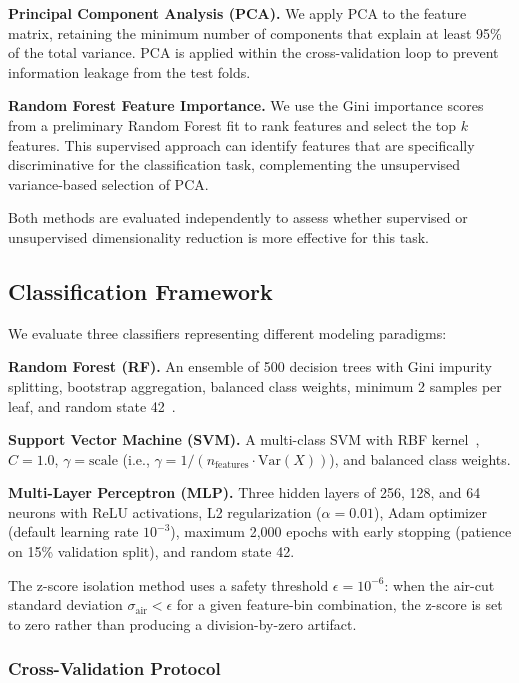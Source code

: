 \textbf{Principal Component Analysis (PCA).} We apply PCA to the feature matrix, retaining the minimum number of components that explain at least 95\% of the total variance. PCA is applied within the cross-validation loop to prevent information leakage from the test folds.

\textbf{Random Forest Feature Importance.} We use the Gini importance scores from a preliminary Random Forest fit to rank features and select the top $k$ features. This supervised approach can identify features that are specifically discriminative for the classification task, complementing the unsupervised variance-based selection of PCA.

Both methods are evaluated independently to assess whether supervised or unsupervised dimensionality reduction is more effective for this task.

\subsection{Classification Framework}\label{sec:classification}

We evaluate three classifiers representing different modeling paradigms:

\textbf{Random Forest (RF).} An ensemble of 500 decision trees with Gini impurity splitting, bootstrap aggregation, balanced class weights, minimum 2 samples per leaf, and random state 42~\cite{breiman2001randomforests}.

\textbf{Support Vector Machine (SVM).} A multi-class SVM with RBF kernel~\cite{widodo2007svm}, $C = 1.0$, $\gamma = \text{scale}$ (i.e., $\gamma = 1 / (n_\text{features} \cdot \mathrm{Var}(X))$), and balanced class weights.

\textbf{Multi-Layer Perceptron (MLP).} Three hidden layers of 256, 128, and 64 neurons with ReLU activations, L2 regularization ($\alpha = 0.01$), Adam optimizer (default learning rate $10^{-3}$), maximum 2{,}000 epochs with early stopping (patience on 15\% validation split), and random state 42.

The z-score isolation method uses a safety threshold $\epsilon = 10^{-6}$: when the air-cut standard deviation $\sigma_\text{air} < \epsilon$ for a given feature-bin combination, the z-score is set to zero rather than producing a division-by-zero artifact.

\subsubsection{Cross-Validation Protocol}

